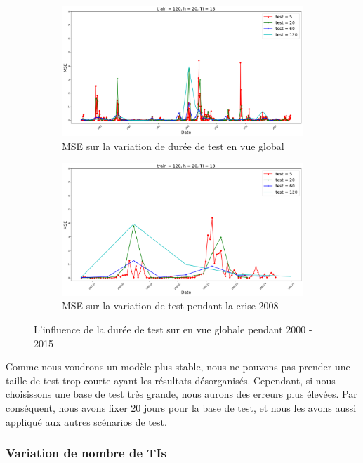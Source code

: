 \begin{figure}[H]
	\centering
	\begin{subfigure}{.5\textwidth}
	\includegraphics[width=.9\linewidth, scale=0.2]
	{plot/MSE_test_global.png}
	\caption{MSE sur la variation de durée de test en vue global}
	\label{fig:test_g}
	\end{subfigure}%
	\begin{subfigure}{.5\textwidth}
	\centering
	\includegraphics[width=.9\linewidth, scale=0.2]
	{plot/MSE_test_2008.png}
	\caption{MSE sur la variation de test pendant la crise 2008}
	\label{fig:test_2008}
	\end{subfigure}
\caption{L'influence de la durée de test sur en vue globale pendant 2000 - 2015}
\label{fig:MSE_test}
\end{figure}

Comme nous voudrons un modèle plus stable, nous ne pouvons pas prender une taille de test trop courte ayant les résultats désorganisés. Cependant, si nous choisissons une base de test très grande, nous aurons des erreurs plus élevées. Par conséquent, nous avons fixer 20 jours pour la base de test, et nous les avons aussi appliqué aux autres scénarios de test.



\subsubsection{Variation de nombre de TIs}

